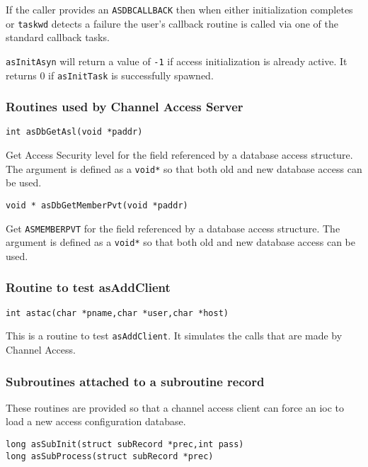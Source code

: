 If the caller provides an \verb|ASDBCALLBACK| then when either initialization completes or \verb|taskwd| detects a failure the user's callback routine is called via one of the standard callback tasks.

\verb|asInitAsyn| will return a value of \verb|-1| if access initialization is already active.
It returns 0 if \verb|asInitTask| is successfully spawned.

\subsubsection{Routines used by Channel Access Server}

\begin{verbatim}
int asDbGetAsl(void *paddr)
\end{verbatim}

Get Access Security level for the field referenced by a database access structure.
The argument is defined as a \verb|void*| so that both old and new database access can be used.

\begin{verbatim}
void * asDbGetMemberPvt(void *paddr)
\end{verbatim}

Get \verb|ASMEMBERPVT| for the field referenced by a database access structure.
The argument is defined as a \verb|void*| so that both old and new database access can be used.

\subsubsection{Routine to test asAddClient}

\begin{verbatim}
int astac(char *pname,char *user,char *host)
\end{verbatim}

This is a routine to test \verb|asAddClient|.
It simulates the calls that are made by Channel Access.

\subsubsection{Subroutines attached to a subroutine record}

These routines are provided so that a channel access client can force an ioc to load a new access configuration database.

\begin{verbatim}
long asSubInit(struct subRecord *prec,int pass)
long asSubProcess(struct subRecord *prec)
\end{verbatim}

